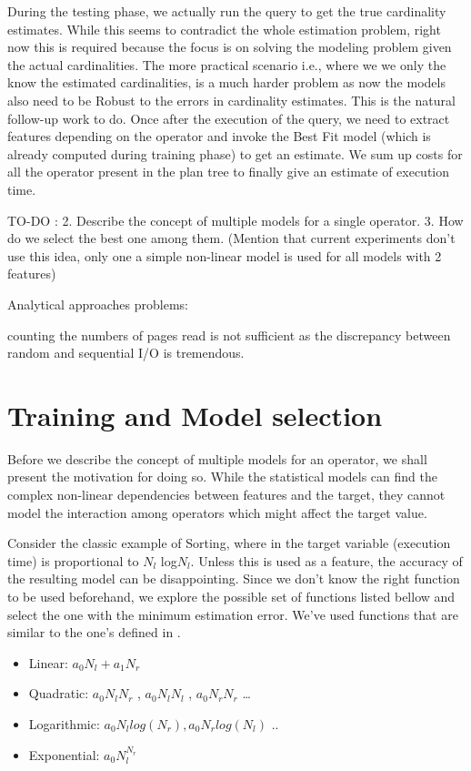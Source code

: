 \documentclass{article}
\begin{document}
\begin{multicols}{2}
	During the testing phase, we actually run the query to get the true cardinality estimates. While this
	seems to contradict the whole estimation problem, right now this is required because the focus is on
	solving the modeling problem given the actual cardinalities. The more practical scenario i.e., where
	we we only the know the estimated cardinalities, is a much harder problem as now the models also need 
	to be Robust to the errors in cardinality estimates. This is the natural follow-up work to do. Once 
	after the execution of the query, we need to extract features depending on the operator and invoke 
	the Best Fit model (which is already computed during training phase) to get an estimate. We sum up 
	costs for all the operator present in the plan tree to finally give an estimate of execution time. 	
	
	
TO-DO :  
2. Describe the concept of multiple models for a single operator.
3. How do we select the best one among them. (Mention that current experiments don't use this idea, only one a simple non-linear model is used for all models with 2 features) 


Analytical approaches problems: 

counting the numbers of pages read is not sufficient as the discrepancy between random and sequential I/O is tremendous.

	\section{Training and Model selection}
	Before we describe the concept of multiple models for an operator, we shall present the motivation 
	for doing so. While the statistical models can find the complex non-linear dependencies between 			features and the target, they cannot model the interaction among operators which might
	affect the target value. 
     
	Consider the classic example of Sorting, where in the target variable (execution time) is 
	proportional to $N_{l}$ log$N_{l}$. Unless this is used as a feature, the accuracy of the resulting 
	model can be disappointing. Since we don't know the right function to be used beforehand, 
	we explore the possible set of functions listed bellow and select the one with the 
	minimum estimation error. We've used functions that are similar to the one's defined in 					\cite{robustIISc}.
	
	\begin{itemize}
	\item Linear: $a_{0} N_{l} + a_{1} N_{r}$ 
	\item Quadratic: $a_{0} N_{l}N_{r}$ , $a_{0} N_{l}N_{l}$ , $a_{0} N_{r}N_{r}$ \ldots
	\item Logarithmic: $a_{0} N_{l} log(N_{r}) , a_{0} N_{r} log(N_{l}) $ .. 
	\item Exponential: $a_{0} N_{l} ^ {N_{r}}$  	
	\end{itemize}	
	

\end{multicols}
\end{document}
